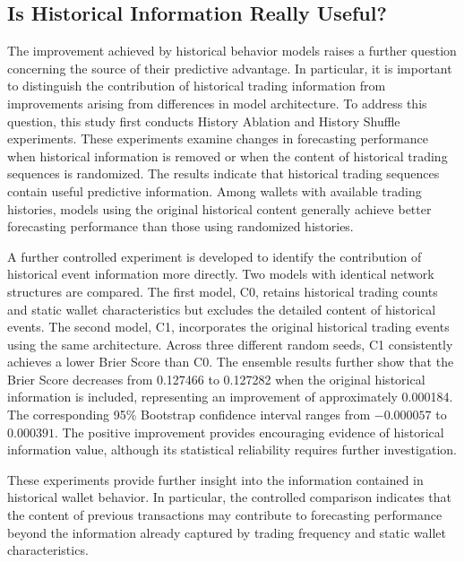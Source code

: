 \subsection{Is Historical Information Really Useful?}

The improvement achieved by historical behavior models raises a further question concerning the source of their predictive advantage. In particular, it is important to distinguish the contribution of historical trading information from improvements arising from differences in model architecture. To address this question, this study first conducts History Ablation and History Shuffle experiments. These experiments examine changes in forecasting performance when historical information is removed or when the content of historical trading sequences is randomized. The results indicate that historical trading sequences contain useful predictive information. Among wallets with available trading histories, models using the original historical content generally achieve better forecasting performance than those using randomized histories.

A further controlled experiment is developed to identify the contribution of historical event information more directly. Two models with identical network structures are compared. The first model, C0, retains historical trading counts and static wallet characteristics but excludes the detailed content of historical events. The second model, C1, incorporates the original historical trading events using the same architecture. Across three different random seeds, C1 consistently achieves a lower Brier Score than C0. The ensemble results further show that the Brier Score decreases from 0.127466 to 0.127282 when the original historical information is included, representing an improvement of approximately 0.000184. The corresponding 95\% Bootstrap confidence interval ranges from $-0.000057$ to $0.000391$. The positive improvement provides encouraging evidence of historical information value, although its statistical reliability requires further investigation.


These experiments provide further insight into the information contained in historical wallet behavior. In particular, the controlled comparison indicates that the content of previous transactions may contribute to forecasting performance beyond the information already captured by trading frequency and static wallet characteristics.

